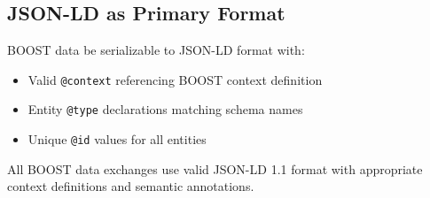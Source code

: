 
\subsection{JSON-LD as Primary Format}
\label{sec:json-ld}

BOOST data \MUST{} be serializable to JSON-LD format with:
\begin{itemize}
    \item Valid \texttt{@context} referencing BOOST context definition
    \item Entity \texttt{@type} declarations matching schema names  
    \item Unique \texttt{@id} values for all entities
\end{itemize}

\begin{normative}[title=JSON-LD Requirements]
All BOOST data exchanges \MUST{} use valid JSON-LD 1.1 format with appropriate context definitions and semantic annotations.
\end{normative}